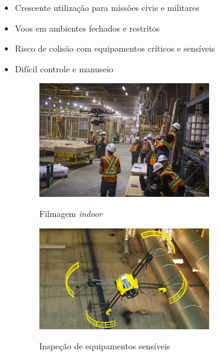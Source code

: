 \documentclass{beamer}
\begin{document}
\begin{frame}[allowframebreaks]
	\frametitle{\insertsubsection}
	\begin{itemize}
	    \item Crescente utilização para missões civis e militares
	     
	    \item Voos em ambientes fechados e restritos
	     
	    \item Risco de colisão com equipamentos críticos e sensíveis
	    
	    \item Difícil controle e manuseio
	    
	    
	\framebreak
		\vspace{2cm}
		
		\begin{figure}
			\centering
			\includegraphics[keepaspectratio = true,
			width=0.7\textwidth]{img/filmagem_drone.jpg}
			\label{fig:obr2013}
			\caption{Filmagem \textit{indoor}}
		\end{figure}
			
	\framebreak
		\vspace{2cm}
		
		\begin{figure}
			\centering
			\includegraphics[keepaspectratio = true,
			width=0.7\textwidth]{img/Inspection-Drone.jpg}
			\label{fig:obr2013}
			\caption{Inspeção de equipamentos sensíveis}
		\end{figure}
			
	\end{itemize}	
\end{frame}
\end{document}
